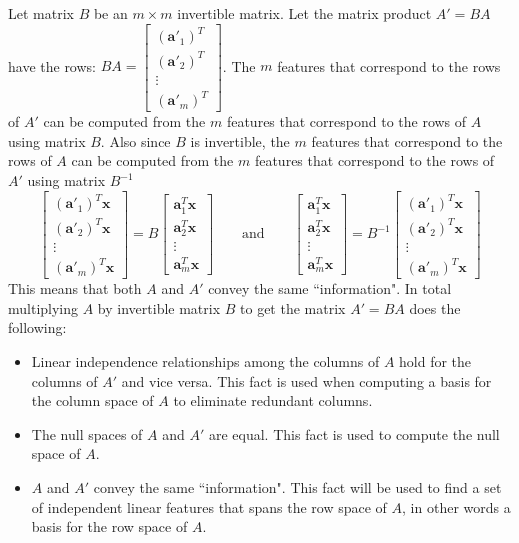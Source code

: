 \documentclass{article}
\begin{document}
Let matrix \(B\) be an \(m \times m\) invertible matrix. Let the matrix product \(A' = BA\) have the rows: \(BA = \begin{bmatrix} (\mathbf{a}'_1)^T \\ (\mathbf{a}'_2)^T \\ \vdots \\ (\mathbf{a}'_m)^T \end{bmatrix}\). The \(m\) features that correspond to the rows of \(A'\) can be computed from the \(m\) features that correspond to the rows of \(A\) using matrix \(B\). Also since \(B\) is invertible, the \(m\) features that correspond to the rows of \(A\) can be computed from the \(m\) features that correspond to the rows of \(A'\) using matrix \(B^{-1}\)
\[\begin{bmatrix} (\mathbf{a}'_1)^T\mathbf{x} \\ (\mathbf{a}'_2)^T\mathbf{x} \\ \vdots \\ (\mathbf{a}'_m)^T\mathbf{x} \end{bmatrix} = B\begin{bmatrix} \mathbf{a}_1^T\mathbf{x} \\ \mathbf{a}_2^T\mathbf{x} \\ \vdots \\ \mathbf{a}_m^T\mathbf{x} \end{bmatrix} \quad\quad\text{and}\quad\quad \begin{bmatrix} \mathbf{a}_1^T\mathbf{x} \\ \mathbf{a}_2^T\mathbf{x} \\ \vdots \\ \mathbf{a}_m^T\mathbf{x} \end{bmatrix} = B^{-1}\begin{bmatrix} (\mathbf{a}'_1)^T\mathbf{x} \\ (\mathbf{a}'_2)^T\mathbf{x} \\ \vdots \\ (\mathbf{a}'_m)^T\mathbf{x} \end{bmatrix}\]
This means that both \(A\) and \(A'\) convey the same ``information". In total multiplying \(A\) by invertible matrix \(B\) to get the matrix \(A' = BA\) does the following:
\begin{itemize}
\item Linear independence relationships among the columns of \(A\) hold for the columns of \(A'\) and vice versa. This fact is used when computing a basis for the column space of \(A\) to eliminate redundant columns.
\item The null spaces of \(A\) and \(A'\) are equal. This fact is used to compute the null space of \(A\). 
\item \(A\) and \(A'\) convey the same ``information". This fact will be used to find a set of independent linear features that spans the row space of \(A\), in other words a basis for the row space of \(A\).  
\end{itemize}  
\end{document}
